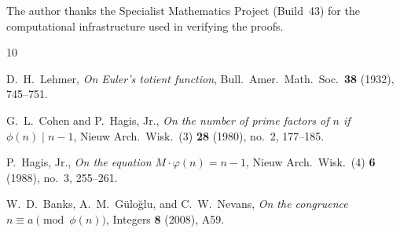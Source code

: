 \documentclass[12pt,a4paper]{amsart}
\theoremstyle{definition}
\begin{document}
The author thanks the Specialist Mathematics Project (Build~43) for the
computational infrastructure used in verifying the proofs.

\begin{thebibliography}{10}

D.~H.~Lehmer,
\emph{On Euler's totient function},
Bull.\ Amer.\ Math.\ Soc.\ \textbf{38} (1932), 745--751.

G.~L.~Cohen and P.~Hagis, Jr.,
\emph{On the number of prime factors of $n$ if $\phi(n) \mid n-1$},
Nieuw Arch.\ Wisk.\ (3) \textbf{28} (1980), no.\ 2, 177--185.

P.~Hagis, Jr.,
\emph{On the equation $M \cdot \varphi(n) = n - 1$},
Nieuw Arch.\ Wisk.\ (4) \textbf{6} (1988), no.\ 3, 255--261.

W.~D.~Banks, A.~M.~G\"{u}lo\u{g}lu, and C.~W.~Nevans,
\emph{On the congruence $n \equiv a \pmod{\phi(n)}$},
Integers \textbf{8} (2008), A59.

\end{thebibliography}
\end{document}
